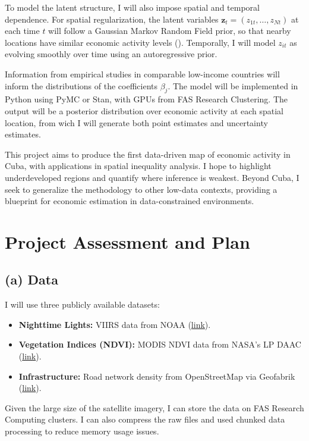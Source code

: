 \documentclass[12pt]{article}
\begin{document}
To model the latent structure, I will also impose spatial and temporal dependence. For spatial regularization, the latent variables \( \mathbf{z}_t = (z_{1t}, \ldots, z_{Nt}) \) at each time \( t \) will follow a Gaussian Markov Random Field prior, so that nearby locations have similar economic activity levels (\cite{steele2017poverty}). Temporally, I will model \( z_{it} \) as evolving smoothly over time using an autoregressive prior.

Information from empirical studies in comparable low-income countries will inform the distributions of the coefficients \( \beta_j \). The model will be implemented in Python using PyMC or Stan, with GPUs from FAS Research Clustering. The output will be a posterior distribution over economic activity at each spatial location, from wich I will generate both point estimates and uncertainty estimates.

This project aims to produce the first data-driven map of economic activity in Cuba, with applications in spatial inequality analysis. I hope to highlight underdeveloped regions and quantify where inference is weakest. Beyond Cuba, I seek to generalize the methodology to other low-data contexts, providing a blueprint for economic estimation in data-constrained environments.


\section{Project Assessment and Plan}

\subsection*{(a) Data}
I will use three publicly available datasets:
\begin{itemize}
    \item \textbf{Nighttime Lights:} VIIRS data from NOAA (\href{https://eogdata.mines.edu/nighttime_light/annual/v20/}{link}).
    \item \textbf{Vegetation Indices (NDVI):} MODIS NDVI data from NASA's LP DAAC (\href{https://lpdaac.usgs.gov/products/mod13a3v061/}{link}).
    \item \textbf{Infrastructure:} Road network density from OpenStreetMap via Geofabrik (\href{https://download.geofabrik.de/}{link}).
\end{itemize}

Given the large size of the satellite imagery, I can store the data on FAS Research Computing clusters. I can also compress the raw files and used chunked data processing to reduce memory usage issues.
\end{document}
